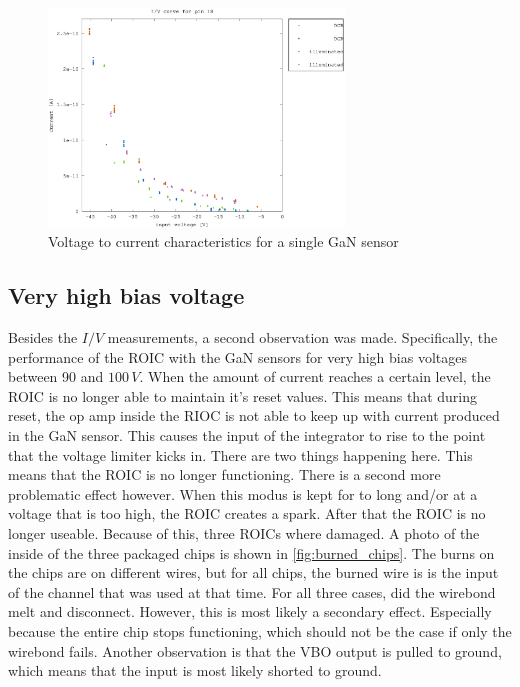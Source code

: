 \begin{figure}[h]
	    \centering
        \includegraphics[width=0.7\textwidth]{fig/pin18_slope_lin_UV.eps}
	    \caption[]%
	    {Voltage to current characteristics for a single GaN sensor}    
	    \label{fig:pin18_slope_lin}	
\end{figure}  

\clearpage
\subsection{Very high bias voltage}\label{ssec:very_high_bias_voltage}
Besides the $I/V$ measurements, a second observation was made. Specifically, the performance of the ROIC with the GaN sensors for very high bias voltages between 90 and $100\,V$. When the amount of current reaches a certain level, the ROIC is no longer able to maintain it's reset values. This means that during reset, the op amp inside the RIOC is not able to keep up with current produced in the GaN sensor. This causes the input of the integrator to rise to the point that the voltage limiter kicks in. There are two things happening here. This means that the ROIC is no longer functioning. There is a second more problematic effect however. When this modus is kept for to long and/or at a voltage that is too high, the ROIC creates a spark. After that the ROIC is no longer useable. Because of this, three ROICs where damaged. A photo of the inside of the three packaged chips is shown in \cref{fig:burned_chips}. The burns on the chips are on different wires, but for all chips, the burned wire is is the input of the channel that was used at that time. For all three cases, did the wirebond melt and disconnect. However, this is most likely a secondary effect. Especially because the entire chip stops functioning, which should not be the case if only the wirebond fails. Another observation is that the VBO output is pulled to ground, which means that the input is most likely shorted to ground. 


